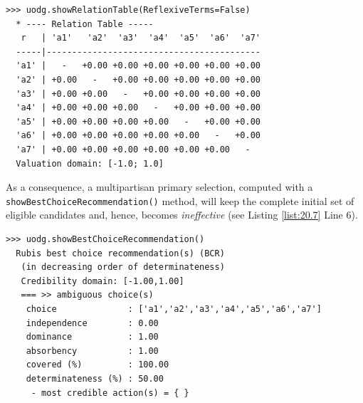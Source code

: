 \begin{lstlisting}
>>> uodg.showRelationTable(ReflexiveTerms=False)
  * ---- Relation Table -----
   r   | 'a1'   'a2'  'a3'  'a4'  'a5'  'a6'  'a7'   
  -----|------------------------------------------
  'a1' |   -   +0.00 +0.00 +0.00 +0.00 +0.00 +0.00  
  'a2' | +0.00   -   +0.00 +0.00 +0.00 +0.00 +0.00  
  'a3' | +0.00 +0.00   -   +0.00 +0.00 +0.00 +0.00  
  'a4' | +0.00 +0.00 +0.00   -   +0.00 +0.00 +0.00  
  'a5' | +0.00 +0.00 +0.00 +0.00   -   +0.00 +0.00  
  'a6' | +0.00 +0.00 +0.00 +0.00 +0.00   -   +0.00  
  'a7' | +0.00 +0.00 +0.00 +0.00 +0.00 +0.00   -   
  Valuation domain: [-1.0; 1.0]
\end{lstlisting}      

As a consequence, a multipartisan primary selection, computed with a \texttt{showBestChoiceRecommendation()} method,  will keep the complete initial set of eligible candidates and, hence, becomes \emph{ineffective} (see Listing \ref{list:20.7} Line 6).
\begin{lstlisting}[caption={Example of ineffective primary multipartisan selection},label=list:20.7]
>>> uodg.showBestChoiceRecommendation()
  Rubis best choice recommendation(s) (BCR)
   (in decreasing order of determinateness)   
   Credibility domain: [-1.00,1.00]
   === >> ambiguous choice(s)
    choice              : ['a1','a2','a3','a4','a5','a6','a7']
    independence        : 0.00
    dominance           : 1.00
    absorbency          : 1.00
    covered (%)         : 100.00
    determinateness (%) : 50.00
     - most credible action(s) = { }
\end{lstlisting}

